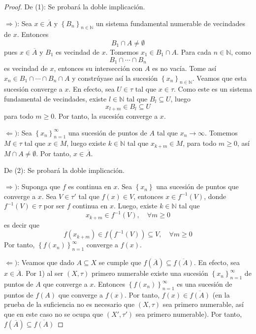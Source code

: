 \documentclass[12pt]{report}
\theoremstyle{largebreak}
\newcommand{\Cls}[1]{\ensuremath{\overline{#1}}}
\begin{document}
    \begin{proof}
        De (1): Se probará la doble implicación.

        $\Rightarrow)$: Sea $x\in\Cls{A}$ y $\left\{ B_n\right\}_{n\in\mathbb{N}}$ un sistema fundamental numerable de vecindades de $x$. Entonces
        \begin{equation*}
            B_1\cap A\neq\emptyset
        \end{equation*}
        pues $x\in\Cls{A}$ y $B_1$ es vecindad de $x$. Tomemos $x_1\in B_1\cap A$. Para cada $n\in\mathbb{N}$, como
        \begin{equation*}
            B_1\cap\cdots\cap B_n
        \end{equation*} 
        es vecindad de $x$, entonces su intersección con $A$ es no vacía. Tome así $x_n\in B_1\cap\cdots\cap B_n\cap A$ y constrúyase así la sucesión $\left\{x_n \right\}_{ n\in\mathbb{N}}$. Veamos que esta sucesión converge a $x$. En efecto, sea $U\in\tau$ tal que $x\in\tau$. Como este es un sistema fundamental de vecindades, existe $l\in\mathbb{N}$ tal que $B_l\subseteq U$, luego
        \begin{equation*}
            x_{l+m}\in B_l\subseteq U
        \end{equation*}
        para todo $m\geq 0$. Por tanto, la sucesión converge a $x$.

        $\Leftarrow)$: Sea $\left\{ x_n\right\}_{ n=1}^\infty$ una sucesión de puntos de $A$ tal que $x_n\rightarrow\infty$. Tomemos $M\in\tau$ tal que $x\in M$, luego existe $k\in\mathbb{N}$ tal que $x_{ k+m}\in M$, para todo $m\geq 0$, así $M\cap A\neq\emptyset$. Por tanto, $x\in\Cls{A}$.

        De (2): Se probará la doble implicación.

        $\Rightarrow)$: Suponga que $f$ es continua en $x$. Sea $\left\{x_n \right\}$ una sucesión de puntos que converge a $x$. Sea $V\in\tau'$ tal que $f(x)\in V$, entonces $x\in f^{-1}(V)$, donde $f^{-1}(V)\in\tau$ por ser $f$ continua en $x$. Luego, existe $k\in\mathbb{N}$ tal que
        \begin{equation*}
            x_{ k+m}\in f^{-1}(V),\quad\forall m\geq0
        \end{equation*}
        es decir que
        \begin{equation*}
            f(x_{ k+m})\in f(f^{-1}(V))\subseteq V,\quad\forall m\geq0
        \end{equation*}
        Por tanto, $\left\{f(x_n) \right\}_{ n=1}^\infty$ converge a $f(x)$.

        $\Leftarrow)$: Veamos que dado $A\subseteq X$ se cumple que $f(\Cls{A})\subseteq\Cls{f(A)}$. En efecto, sea $x\in\Cls{A}$. Por 1) al ser $(X,\tau)$ primero numerable existe una sucesión $\left\{x_n \right\}_{ n=1}^\infty$ de puntos de $A$ que converge a $x$. Entonces $\left\{f(x_n) \right\}_{ n=1}^\infty$ es una sucesión de puntos de $f(A)$ que converge a $f(x)$. Por tanto, $f(x)\in\Cls{f(A)}$ (en la prueba de la suficiencia no es necesario que $(X,\tau)$ sea primero numerable, así que en este caso no se ocupa que $(X',\tau')$ sea primero numerable). Por tanto, $f(\Cls{A})\subseteq\Cls{f(A)}$
    \end{proof}
\end{document}
